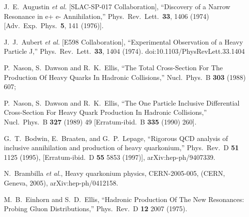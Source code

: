 \documentclass[aps,prc,preprint,superscriptaddress,showpacs,showkeys,amsmath]{revtex4-1}
\begin{document}



\noindent
\begin{thebibliography}{100}
\medskip

  J.~E.~Augustin {\it et al.} [SLAC-SP-017 Collaboration],
  ``Discovery of a Narrow Resonance in e+ e- Annihilation,''
  Phys.\ Rev.\ Lett.\  {\bf 33}, 1406 (1974)
  [Adv.\ Exp.\ Phys.\  {\bf 5}, 141 (1976)].

  J.~J.~Aubert {\it et al.} [E598 Collaboration],
  ``Experimental Observation of a Heavy Particle J,''
  Phys.\ Rev.\ Lett.\  {\bf 33}, 1404 (1974).
  doi:10.1103/PhysRevLett.33.1404
  
  P.~Nason, S.~Dawson and R.~K.~Ellis,
  ``The Total Cross-Section For The Production Of Heavy Quarks In Hadronic Collisions,''
  Nucl.\ Phys.\ B {\bf 303} (1988) 607;
  
  P.~Nason, S.~Dawson and R.~K.~Ellis,
  ``The One Particle Inclusive Differential Cross-Section For Heavy Quark Production In Hadronic Collisions,''
  Nucl.\ Phys.\ B {\bf 327} (1989) 49
  [Erratum-ibid.\ B {\bf 335} (1990) 260].

G.~T.~Bodwin, E.~Braaten, and G.~P.~Lepage,
``Rigorous QCD analysis of inclusive annihilation and production of heavy
quarkonium,''
Phys.\ Rev.\ D {\bf 51} 1125 (1995), 
[Erratum-ibid.\ D {\bf 55} 5853 (1997)],
arXiv:hep-ph/9407339.

  N.~Brambilla {\it et al.},
  Heavy quarkonium physics,
  CERN-2005-005, (CERN, Geneva, 2005),
   arXiv:hep-ph/0412158.



  M.~B.~Einhorn and S.~D.~Ellis,
  ``Hadronic Production Of The New Resonances: Probing Gluon Distributions,''
  Phys.\ Rev.\  D {\bf 12} 2007 (1975).


\end{thebibliography}
\end{document}
